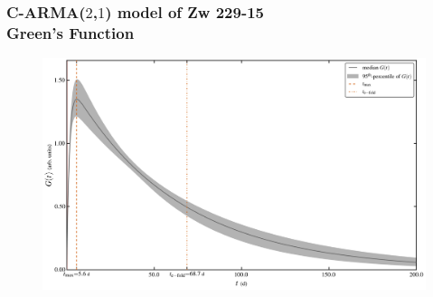 \documentclass[hyperref={pdfpagelabels=false}]{beamer}
\begin{document}
\begin{frame}
\frametitle{C-ARMA($2$,$1$) model of Zw 229-15\\Green's Function}
  \begin{figure}
    \includegraphics[scale=0.065]{images/Zw229-15_GF.jpg}
  \end{figure}
\end{frame}
\end{document}
